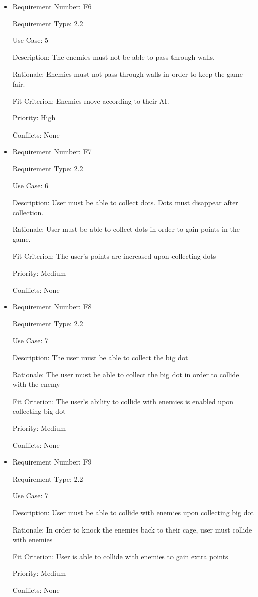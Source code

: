 \documentclass[12pt, titlepage]{article}
\begin{document}
\begin{itemize}
\item
Requirement Number: F6

Requirement Type: 2.2

Use Case: 5

Description: The enemies must not be able to pass through walls.

Rationale: Enemies must not pass through walls in order to keep the game fair.

Fit Criterion: Enemies move according to their AI.

Priority: High

Conflicts: None
\end{itemize}

\begin{itemize}
\item
Requirement Number: F7

Requirement Type: 2.2

Use Case: 6

Description: User must be able to collect dots. Dots must disappear after collection.

Rationale: User must be able to collect dots in order to gain points in the game.

Fit Criterion: The user's points are increased upon collecting dots

Priority: Medium

Conflicts: None
\end{itemize}

\begin{itemize}
\item
Requirement Number: F8

Requirement Type: 2.2

Use Case: 7

Description: The user must be able to collect the big dot

Rationale: The user must be able to collect the big dot in order to collide with the enemy

Fit Criterion: The user's ability to collide with enemies is enabled upon collecting big dot

Priority: Medium

Conflicts: None
\end{itemize}

\begin{itemize}
\item
Requirement Number: F9

Requirement Type: 2.2

Use Case: 7

Description: User must be able to collide with enemies upon collecting big dot

Rationale: In order to knock the enemies back to their cage, user must collide with enemies

Fit Criterion: User is able to collide with enemies to gain extra points

Priority: Medium

Conflicts: None
\end{itemize}
\end{document}
